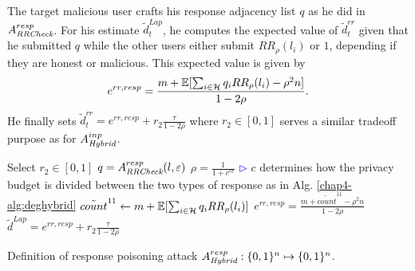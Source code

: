 The target malicious user crafts his response adjacency list $q$ as he did in $A_{\textit{RRCheck}}^{resp}$. For his estimate $\tilde{d}_t^{Lap}$, he computes the expected value of $\tilde{d}_t^{rr}$ given that he submitted $q$ while the other users either submit $RR_\rho(l_i)$ or $1$, depending if they are honest or malicious. This expected value is given by
\[
e^{rr, resp} = \frac{m + \operatorname{\mathbb{E}}[\sum_{i \in \mathcal{H}} q_i RR_\rho(l_i) - \rho^2 n]}{1-2\rho}.
\]
He finally sets $\tilde{d}_t^{rr} = e^{rr,resp} + r_2 \frac{\tau}{1-2\rho}$ where $r_2 \in [0,1]$ serves a similar tradeoff purpose as for $A_{\textit{Hybrid}}^{inp}$. 

\begin{algorithm}[bt]
  Select $r_2\in [0,1]$\;
	$q=A_{\textit{RRCheck}}^{resp}(l, \varepsilon)$\;
	$\rho=\frac{1}{1+e^{c\epsilon}}$\;
	\hfill\textcolor{blue}{$\rhd$} $c$ determines how the privacy budget is divided between the two types of response as in Alg. \ref{chap4-alg:deghybrid}\;
	$\tilde{count}^{11} \gets m + \operatorname{\mathbb{E}}[\sum_{i \in \mathcal{H}} q_i RR_\rho(l_i)]$\;
	$e^{rr,resp} = \frac{m + \tilde{count}^{11} - \rho^2 n}{1-2\rho}$\;
	$\tilde{d}^{Lap} = e^{rr,resp} + r_2 \frac{\tau}{1-2\rho}$\;
  \caption[Definition of response poisoning attack $A_{\DegHybrid}^{resp}$.]{Definition of response poisoning attack $A_{\textit{Hybrid}}^{resp}: \{0,1\}^n\mapsto\{0,1\}^n$. }
\end{algorithm}

%  
%  



